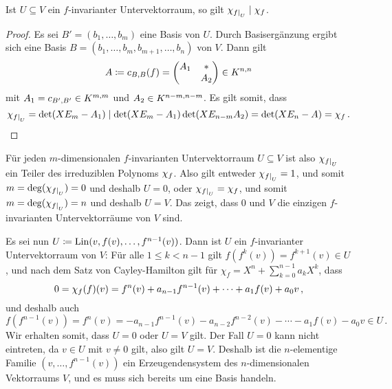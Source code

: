 \begin{lemma}
  Ist $U \subseteq V$ ein $f$-invarianter Untervektorraum, so gilt $\charpoly{\restrict{f}{U}} \divides \charpoly{f}$.
\end{lemma}

\begin{proof}
  Es sei $B' = (b_1, \dotsc, b_m)$ eine Basis von $U$.
  Durch Basisergänzung ergibt sich eine Basis $B = (b_1, \dotsc, b_m, b_{m+1}, \dotsc, b_n)$ von $V$.
  Dann gilt
  \[
              A
    \defined  c_{B,B}(f)
    =         \begin{pmatrix}
                A_1 & *   \\
                    & A_2
              \end{pmatrix}
    \in       \matrices{n}{K}
  \]
  mit $A_1 = c_{B',B'} \in \matrices{m}{K}$ und $A_2 \in \matrices{n-m}{K}$.
  Es gilt somit, dass
  \[
              \charpoly{\restrict{f}{U}}
    =         \det(X E_m - A_1)
    \divides  \det(X E_m - A_1) \det(X E_{n-m} A_2)
    =         \det(X E_n - A)
    =         \charpoly{f} \,.
  \]
\end{proof}

Für jeden $m$-dimensionalen $f$-invarianten Untervektorraum $U \subseteq V$ ist also $\charpoly{\restrict{f}{U}}$ ein Teiler des irreduziblen Polynoms $\charpoly{f}$.
Also gilt entweder $\charpoly{\restrict{f}{U}} = 1$, und somit $m = \deg(\charpoly{\restrict{f}{U}}) = 0$ und deshalb $U = 0$, oder $\charpoly{\restrict{f}{U}} = \charpoly{f}$, und somit $m = \deg(\charpoly{\restrict{f}{U}}) = n$ und deshalb $U = V$.
Das zeigt, dass $0$ und $V$ die einzigen $f$-invarianten Untervektorräume von $V$ sind.

Es sei nun $U \defined \Lin(v, f(v), \dotsc, f^{n-1}(v))$.
Dann ist $U$ ein $f$-invarianter Untervektorraum von $V$:
Für alle $1 \leq k < n-1$ gilt $f(f^k(v)) = f^{k+1}(v) \in U$, und nach dem Satz von Cayley-Hamilton gilt für $\chi_f = X^n + \sum_{k=0}^{n-1} a_k X^k$, dass
\[
    0
  = \charpoly{f}(f)(v)
  = f^n(v) + a_{n-1} f^{n-1}(v) + \dotsb + a_1 f(v) + a_0 v \,,
\]
und deshalb auch
\[
    f(f^{n-1}(v))
  = f^n(v)
  = - a_{n-1} f^{n-1}(v) - a_{n-2} f^{n-2}(v) - \dotsb - a_1 f(v) - a_0 v
  \in U \,.
\]
Wir erhalten somit, dass $U = 0$ oder $U = V$ gilt.
Der Fall $U = 0$ kann nicht eintreten, da $v \in U$ mit $v \neq 0$ gilt, also gilt $U = V$.
Deshalb ist die $n$-elementige Familie $(v, \dotsc, f^{n-1}(v))$ ein Erzeugendensystem des $n$-dimensionalen Vektorraums $V$, und es muss sich bereits um eine Basis handeln.




